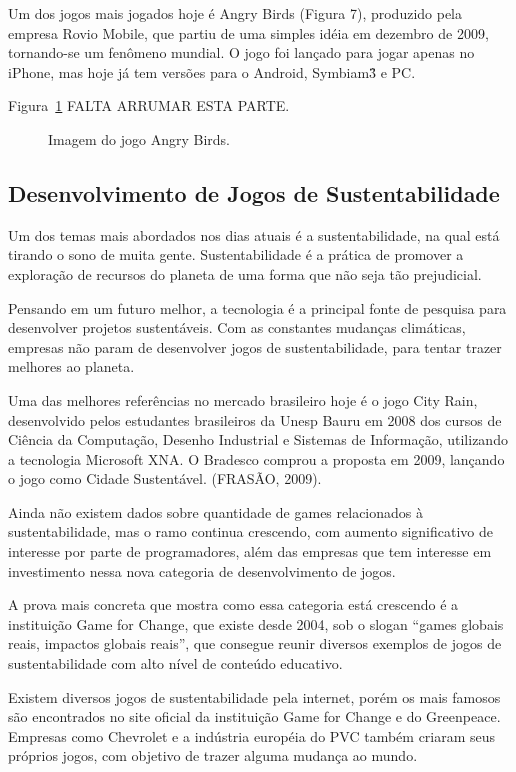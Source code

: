 Um dos jogos mais jogados hoje é Angry Birds (Figura 7), produzido pela empresa Rovio Mobile, que partiu de uma simples idéia em dezembro de 2009, tornando-se um fenômeno mundial. O jogo foi lançado para jogar apenas no iPhone, mas hoje já tem versões para o Android, Symbiam\^3 e PC.

Figura~\ref{f1.8} FALTA ARRUMAR ESTA PARTE.
\begin{figure}[!hbp]
\makebox[\textwidth]{\framebox[5cm]{\rule{0pt}{5cm}}}
\caption{Imagem do jogo Angry Birds.} \label{f1.8}
\end{figure}

\subsection{Desenvolvimento de Jogos de Sustentabilidade}

Um dos temas mais abordados nos dias atuais é a sustentabilidade, na qual está tirando o sono de muita gente. Sustentabilidade é a prática de promover a exploração de recursos do planeta de uma forma que não seja tão prejudicial.

Pensando em um futuro melhor, a tecnologia é a principal fonte de pesquisa para desenvolver projetos sustentáveis. Com as constantes mudanças climáticas, empresas não param de desenvolver jogos de sustentabilidade, para tentar trazer melhores ao planeta.

Uma das melhores referências no mercado brasileiro hoje é o jogo City Rain, desenvolvido pelos estudantes brasileiros da Unesp Bauru em 2008 dos cursos de Ciência da Computação, Desenho Industrial e Sistemas de Informação, utilizando a tecnologia Microsoft XNA. O Bradesco comprou a proposta em 2009, lançando o jogo como Cidade Sustentável.  (FRASÃO, 2009).

Ainda não existem dados sobre quantidade de games relacionados à sustentabilidade, mas o ramo continua crescendo, com aumento significativo de interesse por parte de programadores, além das empresas que tem interesse em investimento nessa nova categoria de desenvolvimento de jogos.

A prova mais concreta que mostra como essa categoria está crescendo é a instituição Game for Change, que existe desde 2004, sob o slogan “games globais reais, impactos globais reais”, que consegue reunir diversos exemplos de jogos de sustentabilidade com alto nível de conteúdo educativo. 

Existem diversos jogos de sustentabilidade pela internet, porém os mais famosos são encontrados no site oficial da instituição Game for Change e do Greenpeace. Empresas como Chevrolet e a indústria européia do PVC também criaram seus próprios jogos, com objetivo de trazer alguma mudança ao mundo. 
 

